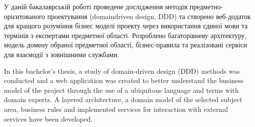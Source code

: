 
У даній бакалаврській роботі проведене дослідження методів
предметно-орієнтованого проектування (domaindriven design, DDD)
та створено веб-додаток для кращого розуміння бізнес моделі
проекту через використання єдиної мови та термінів з
експертами предметної області. Розроблено багаторівневу
архітектуру, модель домену обраної предметної області,
бізнес-правила та реалізовані сервіси для взаємодії з зовнішними службами.

\vspace*{\baselineskip}

In this bachelor's thesis, a study of domain-driven
design (DDD) methods was conducted and a web application
was created to better understand the business model
of the project through the use of a ubiquitous language
and terms with domain experts. A layered
architecture, a domain model of the selected subject area,
business rules and implemented services for interaction
with external services have been developed.

\clearpage
